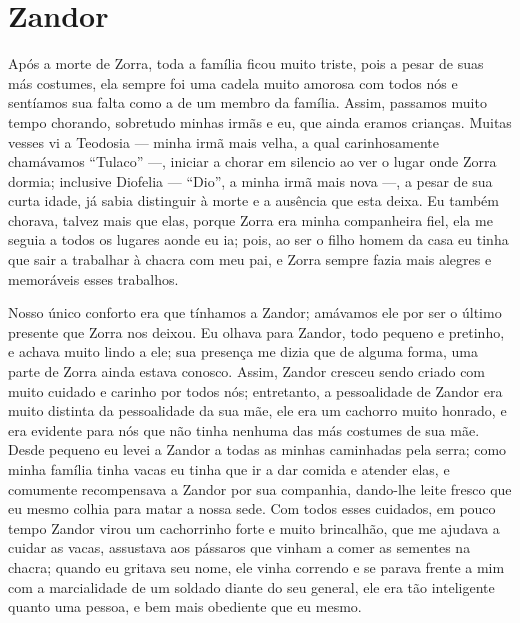\cleardoublepage
\newpage
{}
\chapter{Zandor}

Após a morte de Zorra, toda a família ficou muito triste, pois a pesar de suas más costumes, ela sempre foi uma cadela muito amorosa com todos nós e sentíamos sua falta como a de um membro da família. 
Assim, passamos muito tempo chorando, sobretudo minhas irmãs e eu, que ainda eramos crianças. 
Muitas vesses vi a Teodosia ---  minha irmã mais velha, a qual carinhosamente chamávamos ``Tulaco'' ---, iniciar a chorar em silencio ao ver o lugar onde Zorra dormia; inclusive Diofelia  --- ``Dio'', a minha irmã mais nova ---, a pesar de sua curta idade, já sabia distinguir à morte e a ausência que esta deixa. Eu também chorava, talvez mais que elas, porque Zorra era minha companheira fiel, ela me seguia a todos os lugares aonde eu ia; pois, ao ser o filho homem da casa eu tinha que sair a trabalhar à chacra com meu pai, e Zorra sempre fazia mais alegres e memoráveis esses trabalhos.

Nosso único conforto era que tínhamos a Zandor; amávamos ele por ser o último presente que Zorra nos deixou.
Eu olhava para Zandor, todo pequeno e pretinho, e achava muito lindo a ele; sua presença me dizia que de alguma forma, uma parte de Zorra ainda estava conosco. 
Assim, Zandor cresceu sendo criado com muito cuidado e carinho por todos nós;
entretanto, a pessoalidade de Zandor era muito distinta da pessoalidade da sua mãe, ele era um cachorro muito honrado, e era evidente para nós que não tinha nenhuma das más costumes de sua mãe. 
Desde pequeno eu levei a Zandor a todas as minhas caminhadas pela serra; como minha família tinha vacas eu tinha que ir a dar comida e atender elas, e comumente recompensava a Zandor por sua companhia, dando-lhe leite fresco que eu mesmo colhia para matar a nossa sede. 
Com todos esses cuidados, em pouco tempo Zandor virou um cachorrinho forte e muito brincalhão,
que me ajudava a cuidar as vacas, assustava aos pássaros que vinham a comer as sementes na chacra; quando eu gritava seu nome, ele vinha correndo e se parava frente a mim com a marcialidade de um soldado diante do seu general, ele era tão inteligente quanto uma pessoa, e bem mais obediente que eu mesmo.

